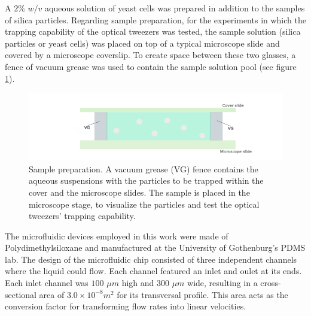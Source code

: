 \documentclass[letterpaper,12pt,oneside]{book}
\begin{document}
A $2\%$ $w/v$ aqueous solution of yeast cells was prepared in addition to the samples of silica particles. 
Regarding sample preparation, for the experiments in which the trapping capability of the optical tweezers was tested, the sample solution (silica particles or yeast cells) was placed on top of a typical microscope slide and covered by a microscope coverslip. To create space between these two glasses, a fence of vacuum grease was used to contain the sample solution pool (see figure \ref{VG}).\\
\begin{figure}[H]
    \centering
    \includegraphics[trim ={1cm 0 0cm 0cm}, scale=.6]{Imagenes teoria/cuci.png}
    \caption{Sample preparation. A vacuum grease (VG) fence contains the aqueous suspensions with the particles to be trapped within the cover and the microscope slides. The sample is placed in the microscope stage, to visualize the particles and test the optical tweezers' trapping capability.}%
    \label{VG}
\end{figure}
The microfluidic devices employed in this work were made of Polydimethylsiloxane and manufactured at the University of Gothenburg's PDMS lab. The design of the microfluidic chip consisted of three independent channels where the liquid could flow. Each channel featured an inlet and oulet at its ends. Each inlet channel was $100$ $\mu m$ high and $300$ $\mu m $ wide, resulting in a cross-sectional area of $3.0 \times 10^{-8} m^2$ for its transversal profile. This area acts as the conversion factor for transforming flow rates into linear velocities.
 
\end{document}
